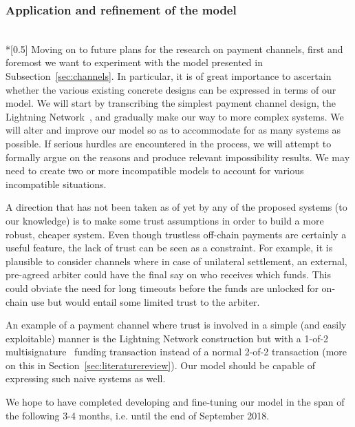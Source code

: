 \subsubsection{Application and refinement of the model} \ \\*[0.5\baselineskip]
  Moving on to future plans for the research on payment channels, first and foremost we
  want to experiment with the model presented in Subsection~\ref{sec:channels}. In
  particular, it is of great importance to ascertain whether the various existing concrete
  designs can be expressed in terms of our model. We will start by transcribing the
  simplest payment channel design, the Lightning Network~\cite{lightning}, and gradually
  make our way to more complex systems. We will alter and improve our model so as to
  accommodate for as many systems as possible. If serious hurdles are encountered in the
  process, we will attempt to formally argue on the reasons and produce relevant
  impossibility results. We may need to create two or more incompatible models to account
  for various incompatible situations.

  A direction that has not been taken as of yet by any of the proposed systems (to our
  knowledge) is to make some trust assumptions in order to build a more robust, cheaper
  system. Even though trustless off-chain payments are certainly a useful feature, the
  lack of trust can be seen as a constraint. For example, it is plausible to consider
  channels where in case of unilateral settlement, an external, pre-agreed arbiter could
  have the final say on who receives which funds. This could obviate the need for long
  timeouts before the funds are unlocked for on-chain use but would entail some limited
  trust to the arbiter.

  An example of a payment channel where trust is involved in a simple (and easily
  exploitable) manner is the Lightning Network construction but with a 1-of-2
  multisignature~\cite{multisig} funding transaction instead of a normal 2-of-2
  transaction (more on this in Section~\ref{sec:literaturereview}). Our model should be
  capable of expressing such naive systems as well.

  We hope to have completed developing and fine-tuning our model in the span of the
  following 3-4 months, i.e. until the end of September 2018.
